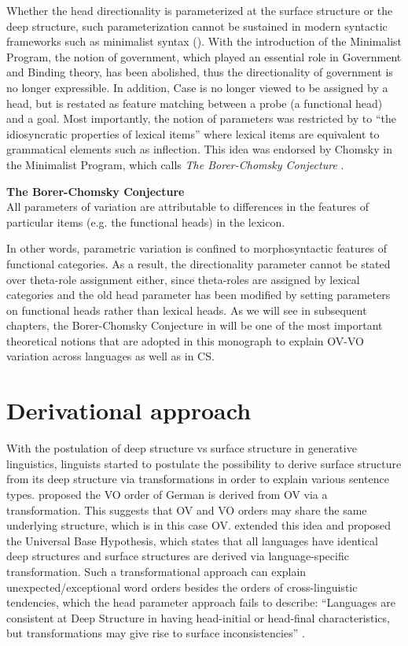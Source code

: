 Whether the head directionality is parameterized at the surface structure or the deep structure, such parameterization cannot be sustained in modern syntactic frameworks such as minimalist syntax (\citealt{Epsteinetal1996}). With the introduction of the Minimalist Program, the notion of government, which played an essential role in Government and Binding theory, has been abolished, thus the directionality of government is no longer expressible. In addition, Case is no longer viewed to be assigned by a head, but is restated as feature matching between a probe (a functional head) and a goal. Most importantly, the notion of parameters was restricted by \citet{Borer1984} to ``the idiosyncratic properties of lexical items'' where lexical items are equivalent to grammatical elements such as inflection. This idea was endorsed by Chomsky in the Minimalist Program, which \citet{Baker2008} calls \textit{The Borer-Chomsky Conjecture} .

\ea\label{ex:BorChomCon} \textbf{The Borer-Chomsky Conjecture} \\
All parameters of variation are attributable to differences in the features of particular items (e.g. the functional heads) in the lexicon. 
\z

In other words, parametric variation is confined to morphosyntactic features of functional categories. As a result, the directionality parameter cannot be stated over theta-role assignment either, since theta-roles are assigned by lexical categories and the old head parameter has been modified by setting parameters on functional heads rather than lexical heads. As we will see in subsequent chapters, the Borer-Chomsky Conjecture in  will be one of the most important theoretical notions that are adopted in this monograph to explain \ac{OV}-\ac{VO} variation across languages as well as in \ac{CS}. 

\section{Derivational approach}\label{ch3:sect:3.2}

With the postulation of deep structure vs surface structure in generative linguistics, linguists started to postulate the possibility to derive surface structure from its deep structure via transformations in order to explain various sentence types. \citet{Bach1962} proposed the \ac{VO} order of German is derived from \ac{OV} via a transformation. This suggests that \ac{OV} and \ac{VO} orders may share the same underlying structure, which is in this case \ac{OV}. \citet{Bach1968} extended this idea and proposed the Universal Base Hypothesis, which states that all languages have identical deep structures and surface structures are derived via language-specific transformation. Such a transformational approach can explain unexpected/exceptional word orders besides the orders of cross-linguistic tendencies, which the head parameter approach fails to describe: ``Languages are consistent at Deep Structure in having head-initial or head-final characteristics, but transformations may give rise to surface inconsistencies'' \citep[4]{Svenonius2000}. 

